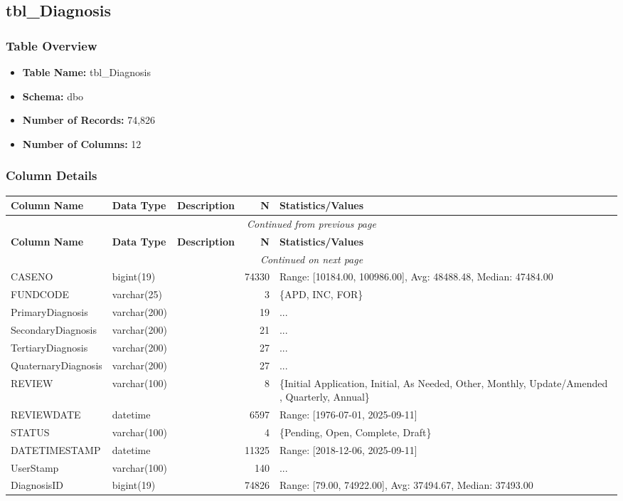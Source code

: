\begin{landscape}
\subsection{tbl\_Diagnosis}

\subsubsection{Table Overview}
\begin{itemize}
\item \textbf{Table Name:} tbl\_Diagnosis
\item \textbf{Schema:} dbo
\item \textbf{Number of Records:} 74,826
\item \textbf{Number of Columns:} 12
\end{itemize}

\subsubsection{Column Details}
\begin{longtable}{|l|l|l|r|p{6cm}|}
\hline
\textbf{Column Name} & \textbf{Data Type} & \textbf{Description} & \textbf{N} & \textbf{Statistics/Values} \\
\hline
\endfirsthead
\multicolumn{5}{c}{\textit{Continued from previous page}} \\
\hline
\textbf{Column Name} & \textbf{Data Type} & \textbf{Description} & \textbf{N} & \textbf{Statistics/Values} \\
\hline
\endhead
\hline
\multicolumn{5}{c}{\textit{Continued on next page}} \\
\endfoot
\hline
\endlastfoot
CASENO & bigint(19) &  & 74330 & Range: [10184.00, 100986.00], Avg: 48488.48, Median: 47484.00 \\
\hline
FUNDCODE & varchar(25) &  & 3 & \{APD, INC, FOR\} \\
\hline
PrimaryDiagnosis & varchar(200) &  & 19 & ... \\
\hline
SecondaryDiagnosis & varchar(200) &  & 21 & ... \\
\hline
TertiaryDiagnosis & varchar(200) &  & 27 & ... \\
\hline
QuaternaryDiagnosis & varchar(200) &  & 27 & ... \\
\hline
REVIEW & varchar(100) &  & 8 & \{Initial Application, Initial, As Needed, Other, Monthly, Update/Amended , Quarterly, Annual\} \\
\hline
REVIEWDATE & datetime &  & 6597 & Range: [1976-07-01, 2025-09-11] \\
\hline
STATUS & varchar(100) &  & 4 & \{Pending, Open, Complete, Draft\} \\
\hline
DATETIMESTAMP & datetime &  & 11325 & Range: [2018-12-06, 2025-09-11] \\
\hline
UserStamp & varchar(100) &  & 140 & ... \\
\hline
DiagnosisID & bigint(19) &  & 74826 & Range: [79.00, 74922.00], Avg: 37494.67, Median: 37493.00 \\
\hline
\end{longtable}


\end{landscape}

